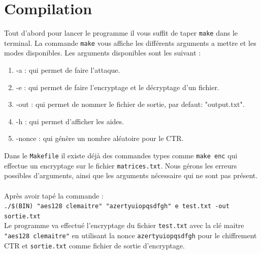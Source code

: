 \documentclass[10pt, a4paper]{report}
\begin{document}
	\chapter{Compilation}
	Tout d'abord pour lancer le programme il vous suffit de taper \verb|make| dans le terminal. La commande \verb|make| vous affiche les différents arguments a mettre et les modes disponibles. Les arguments disponibles sont les suivant :
	\begin{enumerate}
		\item -a : qui permet de faire l'attaque.
		\item -e : qui permet de faire l'encryptage et le décryptage d'un fichier.
		\item -out : qui permet de nommer le fichier de sortie, par defaut: "output.txt".
		\item -h : qui permet d'afficher les aides.
		\item -nonce : qui génère un nombre aléatoire pour le CTR.
	\end{enumerate}
	Dans le \verb|Makefile| il existe déjà des commandes types comme \verb|make enc| qui effectue un encryptage sur le fichier \verb|matrices.txt|.
	Nous gérons les erreurs possibles d'arguments, ainsi que les arguments nécessaire qui ne sont pas présent.
	\\\\
	Après avoir tapé la commande : \\
	\verb|./$(BIN) "aes128 clemaitre" "azertyuiopqsdfgh" e test.txt -out sortie.txt|\\
	Le programme va effectué l'encryptage du fichier \verb|test.txt| avec la clé maitre \verb|"aes128 clemaitre"| en utilisant la nonce \verb|azertyuiopqsdfgh| pour le chiffrement CTR et \verb|sortie.txt| comme fichier de sortie d'encryptage.
	\\\\
\end{document}
